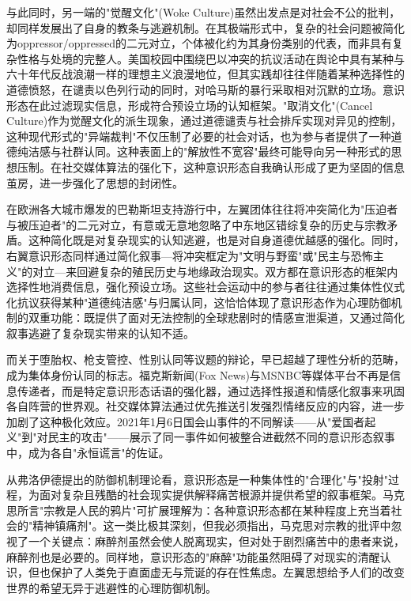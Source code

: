 \documentclass{article}
\begin{document}
与此同时，另一端的"觉醒文化"(Woke Culture)虽然出发点是对社会不公的批判，却同样发展出了自身的教条与逃避机制。在其极端形式中，复杂的社会问题被简化为oppressor/oppressed的二元对立，个体被化约为其身份类别的代表，而非具有复杂性格与处境的完整人。美国校园中围绕巴以冲突的抗议活动在舆论中具有某种与六十年代反战浪潮一样的理想主义浪漫地位，但其实践却往往伴随着某种选择性的道德愤怒，在谴责以色列行动的同时，对哈马斯的暴行采取相对沉默的立场。意识形态在此过滤现实信息，形成符合预设立场的认知框架。"取消文化"(Cancel Culture)作为觉醒文化的派生现象，通过道德谴责与社会排斥实现对异见的控制，这种现代形式的"异端裁判"不仅压制了必要的社会对话，也为参与者提供了一种道德纯洁感与社群认同。这种表面上的"解放性不宽容"最终可能导向另一种形式的思想压制。在社交媒体算法的强化下，这种意识形态自我确认形成了更为坚固的信息茧房，进一步强化了思想的封闭性。

在欧洲各大城市爆发的巴勒斯坦支持游行中，左翼团体往往将冲突简化为"压迫者与被压迫者"的二元对立，有意或无意地忽略了中东地区错综复杂的历史与宗教矛盾。这种简化既是对复杂现实的认知逃避，也是对自身道德优越感的强化。同时，右翼意识形态同样通过简化叙事—将冲突框定为"文明与野蛮"或"民主与恐怖主义"的对立—来回避复杂的殖民历史与地缘政治现实。双方都在意识形态的框架内选择性地消费信息，强化预设立场。这些社会运动中的参与者往往通过集体性仪式化抗议获得某种"道德纯洁感"与归属认同，这恰恰体现了意识形态作为心理防御机制的双重功能：既提供了面对无法控制的全球悲剧时的情感宣泄渠道，又通过简化叙事逃避了复杂现实带来的认知不适。

而关于堕胎权、枪支管控、性别认同等议题的辩论，早已超越了理性分析的范畴，成为集体身份认同的标志。福克斯新闻(Fox News)与MSNBC等媒体平台不再是信息传递者，而是特定意识形态话语的强化器，通过选择性报道和情感化叙事来巩固各自阵营的世界观。社交媒体算法通过优先推送引发强烈情绪反应的内容，进一步加剧了这种极化效应。2021年1月6日国会山事件的不同解读——从"爱国者起义"到"对民主的攻击"——展示了同一事件如何被整合进截然不同的意识形态叙事中，成为各自"永恒谎言"的佐证。

从弗洛伊德提出的防御机制理论看，意识形态是一种集体性的"合理化"与"投射"过程，为面对复杂且残酷的社会现实提供解释痛苦根源并提供希望的叙事框架。马克思所言"宗教是人民的鸦片"可扩展理解为：各种意识形态都在某种程度上充当着社会的"精神镇痛剂"。这一类比极其深刻，但我必须指出，马克思对宗教的批评中忽视了一个关键点：麻醉剂虽然会使人脱离现实，但对处于剧烈痛苦中的患者来说，麻醉剂也是必要的。同样地，意识形态的"麻醉"功能虽然阻碍了对现实的清醒认识，但也保护了人类免于直面虚无与荒诞的存在性焦虑。左翼思想给予人们的改变世界的希望无异于逃避性的心理防御机制。
\end{document}
